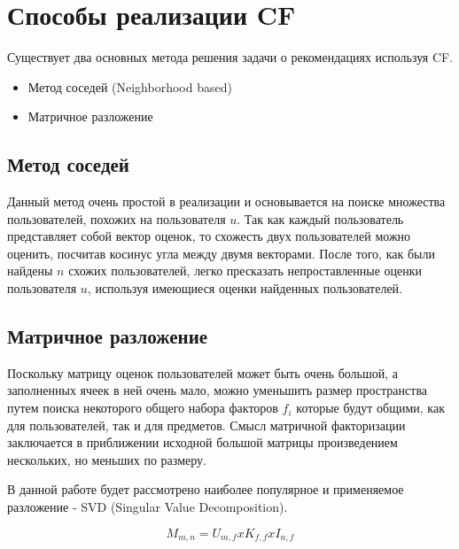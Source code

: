 \section{Способы реализации CF}

Существует два основных метода решения задачи о рекомендациях используя CF.

\begin{itemize}
\item Метод соседей (Neighborhood based) 
\item Матричное разложение
\end{itemize}

\subsection{Метод соседей}

Данный метод очень простой в реализации и основывается на поиске множества пользователей, похожих на пользователя $u$. Так как каждый пользователь представляет собой вектор оценок, то схожесть двух пользователей можно оценить, посчитав косинус угла между двумя векторами. После того, как были найдены $n$ схожих пользователей, легко пресказать непроставленные оценки пользователя $u$, используя имеющиеся оценки найденных пользователей.

\subsection{Матричное разложение}

Поскольку матрицу оценок пользователей может быть очень большой, а заполненных ячеек в ней очень мало, можно уменьшить размер пространства путем поиска некоторого общего набора факторов $f_i$ которые будут общими, как для пользователей, так и для предметов. Смысл матричной факторизации заключается в приближении исходной большой матрицы произведением нескольких, но меньших по размеру.

В данной работе будет рассмотрено наиболее популярное и применяемое разложение - SVD (Singular Value Decomposition).

$$
M_{m,n} = U_{m,f} x K_{f,f} x I_{n,f}
$$


